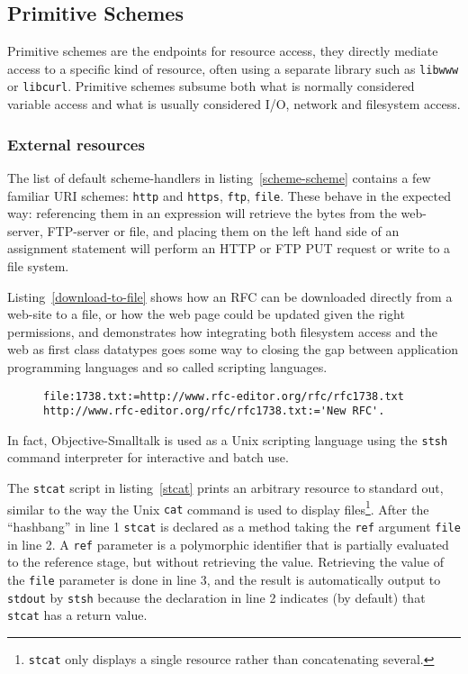\documentclass[preprint,authoryear]{acm_proc_article-sp}
\begin{document}
\subsection{Primitive Schemes}
\label{primitiveSchemes}

Primitive schemes are the endpoints for resource access, they directly
mediate access to a specific kind of resource, often using a separate
library such as {\tt libwww} or {\tt libcurl}.  Primitive schemes
subsume both what is normally considered variable access and 
what is usually considered I/O, network and filesystem access.


\subsubsection{External resources}
\label{externalResources}

The list of default scheme-handlers in listing~\ref{scheme-scheme} contains a few familiar URI schemes:
{\tt http} and {\tt https}, {\tt ftp}, {\tt file}.   These behave in the expected way:   referencing them in an expression will
retrieve the bytes from the web-server, FTP-server or file, and placing them on the left hand side of
an assignment statement will perform an HTTP or FTP PUT request or write to a file system. 
 
Listing~\ref{download-to-file} shows how an RFC can be downloaded directly from a web-site
to a file, or how the web page could be updated given the right permissions, and demonstrates how integrating both filesystem access and the web as first class datatypes
goes some way to closing the gap between application programming languages and so called
scripting languages.

\begin{figure}[htbp]
\begin{lstlisting}[style=numbers,label=download-to-file,caption=Downloading an RFC to a file.]
file:1738.txt:=http://www.rfc-editor.org/rfc/rfc1738.txt
http://www.rfc-editor.org/rfc/rfc1738.txt:='New RFC'.
\end{lstlisting}
\end{figure}

In fact,  Objective-Smalltalk is used as a Unix scripting language using the {\tt stsh} command
interpreter for interactive and batch use.  

The {\tt stcat} script in listing~\ref{stcat} prints an arbitrary resource to standard out, 
similar to the way the Unix {\tt cat} command is used to display files\footnote{{\tt stcat} only 
displays a single resource rather than concatenating several.}.
After the ``hashbang'' in line 1 {\tt stcat} is declared as a method taking the {\tt ref} argument {\tt file} 
in line 2.
A {\tt ref} parameter is a polymorphic identifier that is partially evaluated to the reference stage,
but without retrieving the value.  Retrieving the value of the {\tt file} parameter is done in line 3,
and the result is automatically output to {\tt stdout} by {\tt stsh} because the declaration in line
2 indicates (by default) that {\tt stcat} has a return value.
\end{document}
